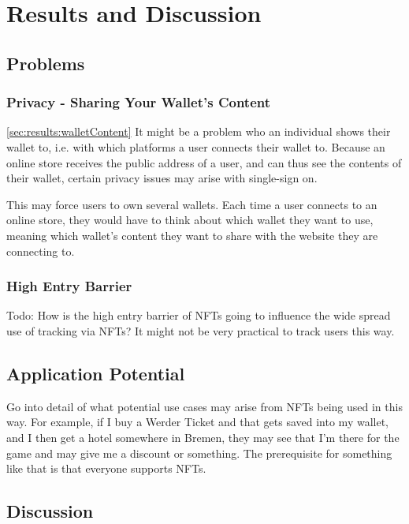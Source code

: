 \chapter{Results and Discussion}
\label{ch:results}


%
%
\section{Problems}
\label{sec:results:problems}


\subsection{Privacy - Sharing Your Wallet's Content}
\ref{sec:results:walletContent}
It might be a problem who an individual shows their wallet to, i.e. with which platforms a user connects their wallet to. Because an online store receives the public address of a user, and can thus see the contents of their wallet, certain privacy issues may arise with single-sign on.

This may force users to own several wallets. Each time a user connects to an online store, they would have to think about which wallet they want to use, meaning which wallet's content they want to share with the website they are connecting to.


%
%
\subsection{High Entry Barrier}
\label{sub:results:barrier}
Todo: How is the high entry barrier of NFTs going to influence the wide spread use of tracking via NFTs? It might not be very practical to track users this way.

%
%
\section{Application Potential}
\label{sec:results:potential}
Go into detail of what potential use cases may arise from NFTs being used in this way. For example, if I buy a Werder Ticket and that gets saved into my wallet, and I then get a hotel somewhere in Bremen, they may see that I'm there for the game and may give me a discount or something. The prerequisite for something like that is that everyone supports NFTs.



%
%
\section{Discussion}
\label{sec:results:discussion}
